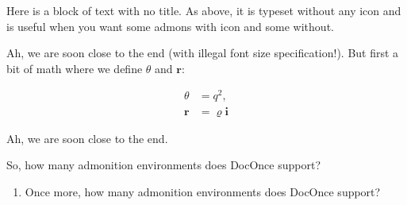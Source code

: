 \documentclass[%
oneside,                 %
final,                   %
10pt]{article}
\newenvironment{noticeshaded}
{\def\FrameCommand{\fboxsep=3mm\colorbox{yellowicon_notice_background}}
 \MakeFramed {\advance\hsize-\width \FrameRestore}}{\endMakeFramed}
\newenvironment{notice_yellowiconadmon}[1][Notice]{
\begin{noticeshaded}
\noindent
\begin{figure}
\vspace{-13pt}
\texttt{[image: latex\_figs/small\_yellow\_notice]}
\end{figure} \textbf{#1}\par
\nobreak\noindent\ignorespaces
}
{
\end{noticeshaded}
}
\newenvironment{questionshaded}
{\def\FrameCommand{\fboxsep=3mm\colorbox{yellowicon_question_background}}
 \MakeFramed {\advance\hsize-\width \FrameRestore}}{\endMakeFramed}
\newenvironment{question_yellowiconadmon}[1][Question]{
\begin{questionshaded}
\noindent
\begin{figure}
\vspace{-13pt}
\texttt{[image: latex\_figs/small\_yellow\_question]}
\end{figure} \textbf{#1}\par
\nobreak\noindent\ignorespaces
}
{
\end{questionshaded}
}
\newenvironment{blockshaded}
{\def\FrameCommand{\fboxsep=3mm\colorbox{yellowicon_block_background}}
 \MakeFramed {\advance\hsize-\width \FrameRestore}}{\endMakeFramed}
\newenvironment{block_yellowiconadmon}[1][Block]{
\begin{blockshaded}
\noindent
 \textbf{#1}\par
\nobreak\noindent\ignorespaces
}
{
\end{blockshaded}
}
\begin{document}
\begin{block_yellowiconadmon}[]
Here is a block of text with no title. As above, it is typeset without any icon
and is useful when you want some admons with icon and some without.
\end{block_yellowiconadmon} %





\begin{notice_yellowiconadmon}
Ah, we are soon close to the end (with illegal font size specification!).
But first a bit of math where we define $\theta$ and $\bm{r}$:

\begin{align*}
\theta &= q^2,\\
\bm{r} &= \varrho\bm{i}
\end{align*}
\end{notice_yellowiconadmon} %





\begin{notice_yellowiconadmon}[Point1]
Ah, we are soon close to the end.
\end{notice_yellowiconadmon} %




\begin{question_yellowiconadmon}[Question]
So, how many admonition environments does DocOnce support?
\end{question_yellowiconadmon} %




\begin{question_yellowiconadmon}[Question]
\begin{enumerate}
 \item Once more, how many admonition environments does DocOnce support?
\end{enumerate}

\noindent
\end{question_yellowiconadmon} %
\end{document}

